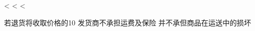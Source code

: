 \begin{CJK}{UTF8}{arialuni}
\vspace{1.5cm}

\parbox{\textwidth}{
\vspace{0.5cm}
<%
  <%
<%

}

\vfill

\parbox{\textwidth}{
若退货将收取价格的10%
发货商不承担运费及保险 并不承但商品在运送中的损坏
}
\vspace{1.0cm}
\end{CJK}


